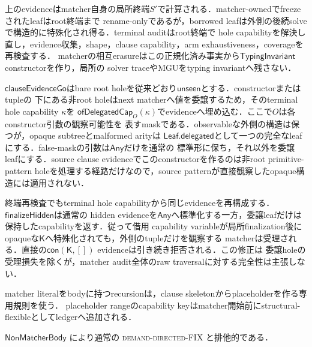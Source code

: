 上のevidenceはmatcher自身の局所終端$S'$で計算される．matcher-ownedでfreezeされたleafはroot終端まで
rename-onlyであるが，borrowed leafは外側の後続solveで構造的に特殊化され得る．terminal auditはroot終端で
hole capabilityを解決し直し，evidence収集，shape，clause capability，arm exhaustiveness，coverageを
再検査する．
matcherの相互erasureはこの正規化済み事実から$\mathsf{TypingInvariant}$ constructorを作り，局所の
solver traceやMGUをtyping invariantへ残さない．

$\mathsf{clauseEvidenceGo}$はbare root holeを従来どおり$\mathsf{unseen}$とする．constructorまたはtupleの
下にある非root holeはnext matcherへ値を委譲するため，そのterminal hole capability $\kappa$を
$\mathsf{ofDelegatedCap}_{O}(\kappa)$でevidenceへ埋め込む．ここで$O$は各constructor引数の観察可能性を
表すmaskである．observableな外側の構造は保つが，opaque subtreeとmalformed arityは
$\mathsf{Leaf.delegated}$として一つの完全なleafにする．false-maskの引数は$\mathsf{Any}$だけを通常の
標準形に保ち，それ以外を委譲leafにする．source clause evidenceでこのconstructorを作るのは非root
primitive-pattern holeを処理する経路だけなので，source patternが直接観察したopaque構造には適用されない．

終端再検査でもterminal hole capabilityから同じevidenceを再構成する．$\mathsf{finalizeHidden}$は通常の
hidden evidenceを$\mathsf{Any}$へ標準化する一方，委譲leafだけは保持したcapabilityを返す．従って借用
capability variableが局所finalization後にopaqueな$\mathsf K$へ特殊化されても，外側のtupleだけを観察する
matcherは受理される．直接の$\mathsf{con}(\mathsf K,[])$ evidenceは引き続き拒否される．この修正は
委譲holeの受理損失を除くが，matcher audit全体のraw traversalに対する完全性は主張しない．

matcher literalをbodyに持つrecursionは，clause skeletonからplaceholderを作る専用規則を使う．
placeholder rangeのcapability keyはmatcher開始前にstructural-flexibleとしてledgerへ追加される．
\begin{mathpar}
\end{mathpar}
$\mathsf{NonMatcherBody}$ により通常の \textsc{demand-directed-FIX} と排他的である．
